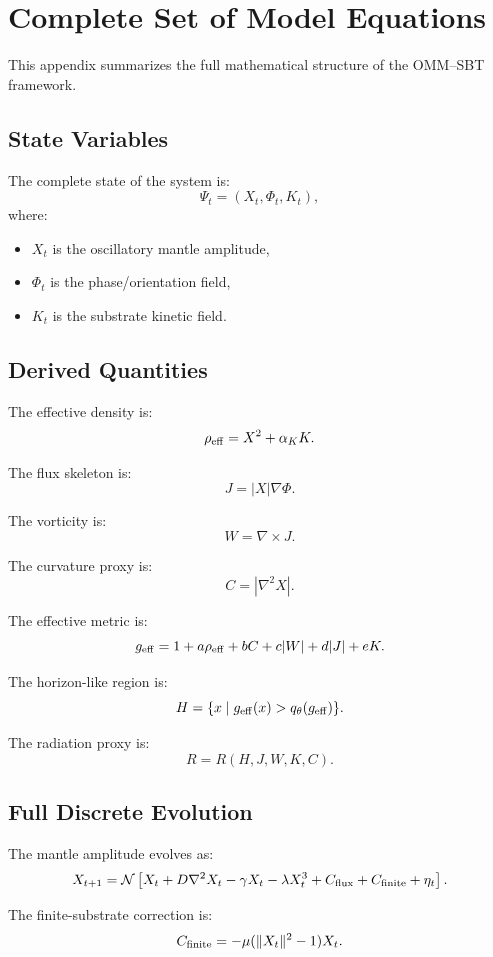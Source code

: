 \documentclass[11pt]{article}
\begin{document}
\appendix

\section{Complete Set of Model Equations}

This appendix summarizes the full mathematical structure of the OMM--SBT framework.

\subsection{State Variables}

The complete state of the system is:
\[
\Psi_t = (X_t,\Phi_t,K_t),
\]
where:
\begin{itemize}
\item $X_t$ is the oscillatory mantle amplitude,
\item $\Phi_t$ is the phase/orientation field,
\item $K_t$ is the substrate kinetic field.
\end{itemize}

\subsection{Derived Quantities}

The effective density is:
\[
\rho_{\rm eff}=X^2+\alpha_K K.
\]

The flux skeleton is:
\[
J=|X|\nabla\Phi.
\]

The vorticity is:
\[
W=\nabla\times J.
\]

The curvature proxy is:
\[
C=|\nabla^2X|.
\]

The effective metric is:
\[
g_{\rm eff}
=
1+a\rho_{\rm eff}+bC+c|W|+d|J|+eK.
\]

The horizon-like region is:
\[
H=\{x\mid g_{\rm eff}(x)>q_\theta(g_{\rm eff})\}.
\]

The radiation proxy is:
\[
R=R(H,J,W,K,C).
\]

\subsection{Full Discrete Evolution}

The mantle amplitude evolves as:
\[
X_{t+1}
=
\mathcal N
\left[
X_t
+
D\nabla^2X_t
-
\gamma X_t
-
\lambda X_t^3
+
C_{\rm flux}
+
C_{\rm finite}
+
\eta_t
\right].
\]

The finite-substrate correction is:
\[
C_{\rm finite}
=
-\mu(\|X_t\|^2-1)X_t.
\]
\end{document}
